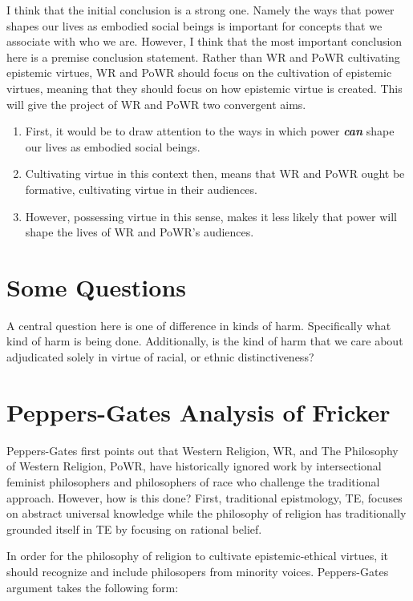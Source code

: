 \documentclass[
  letterpaper,
  DIV=11,
  numbers=noendperiod]{scrreprt}
\providecommand{\tightlist}{%
  \setlength{\itemsep}{0pt}\setlength{\parskip}{0pt}}\usepackage{longtable,booktabs,array}
\begin{document}
\begin{tcolorbox}[enhanced jigsaw, arc=.35mm, breakable, rightrule=.15mm, colback=white, colframe=quarto-callout-important-color-frame, bottomrule=.15mm, leftrule=.75mm, opacityback=0, toprule=.15mm, left=2mm]
\begin{tcolorbox}[enhanced jigsaw, arc=.35mm, breakable, rightrule=.15mm, colback=white, colframe=quarto-callout-tip-color-frame, bottomrule=.15mm, leftrule=.75mm, opacityback=0, toprule=.15mm, left=2mm]
I think that the initial conclusion is a strong one. Namely the ways
that power shapes our lives as embodied social beings is important for
concepts that we associate with who we are. However, I think that the
most important conclusion here is a premise conclusion statement. Rather
than WR and PoWR cultivating epistemic virtues, WR and PoWR should focus
on the cultivation of epistemic virtues, meaning that they should focus
on how epistemic virtue is created. This will give the project of WR and
PoWR two convergent aims.

\begin{enumerate}
\def\labelenumi{\arabic{enumi}.}
\tightlist
\item
  First, it would be to draw attention to the ways in which power
  \textbf{\emph{can}} shape our lives as embodied social beings.
\item
  Cultivating virtue in this context then, means that WR and PoWR ought
  be formative, cultivating virtue in their audiences.
\item
  However, possessing virtue in this sense, makes it less likely that
  power will shape the lives of WR and PoWR's audiences.
\end{enumerate}

\section{Some Questions}\label{some-questions}

A central question here is one of difference in kinds of harm.
Specifically what kind of harm is being done. Additionally, is the kind
of harm that we care about adjudicated solely in virtue of racial, or
ethnic distinctiveness?

\section{Peppers-Gates Analysis of
Fricker}\label{peppers-gates-analysis-of-fricker}

Peppers-Gates first points out that Western Religion, WR, and The
Philosophy of Western Religion, PoWR, have historically ignored work by
intersectional feminist philosophers and philosophers of race who
challenge the traditional approach. However, how is this done? First,
traditional epistmology, TE, focuses on abstract universal knowledge
while the philosophy of religion has traditionally grounded itself in TE
by focusing on rational belief.

In order for the philosophy of religion to cultivate epistemic-ethical
virtues, it should recognize and include philosopers from minority
voices. Peppers-Gates argument takes the following form:


\end{tcolorbox}
\end{tcolorbox}
\end{document}
